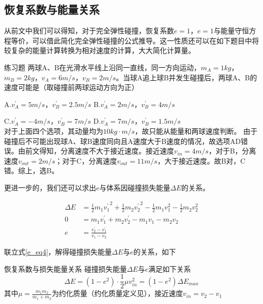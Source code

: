 \subsection{恢复系数与能量关系}

从前文中我们可以得知，对于完全弹性碰撞，恢复系数$e=1$，$e=1$与能量守恒方程等价，可以借此简化完全弹性碰撞的公式推导。这一性质还可以在如下题目中将较复杂的能量计算转换为相对速度的计算，大大简化计算量。

\begin{ep}{练习题}{}
两球A、B在光滑水平线上沿同一直线，同一方向运动，$m_A = 1kg$，$m_B = 2kg$，$v_A = 6m/s$，$v_B = 2m/s$。当球A追上球B并发生碰撞后，两球A、B的速度可能是（取碰撞前两球运动方向为正）

A.$v_A^{\prime} = 5m/s$，$v_B^{\prime} = 2.5m/s$ \quad B.$v_A^{\prime} = 2m/s$，$v_B^{\prime} = 4m/s$

C.$v_A^{\prime} = -4m/s$，$v_B^{\prime} = 7m/s$ \quad D.$v_A^{\prime} = 7m/s$，$v_B^{\prime} = 1.5m/s$
~\\

对于上面四个选项，其动量均为$10kg \cdot m/s$，故只能从能量和两球速度判断。
由于碰撞后不可能出现球A、球B速度同向且A速度大于B速度的情况，故选项AD错误。由前文得知，分离速度不大于接近速度。接近速度$v_{in}=4m/s$，对于B，分离速度$v_{out} = 2m/s$；对于C，分离速度$v_{out} = 11m/s$，大于接近速度。故B对，C错。综上，选B。
\end{ep}

更进一步的，我们还可以求出$e$与体系因碰撞损失能量$\Delta E$的关系。

\begin{equation}
\begin{aligned}
\Delta E &= \frac{1}{2} m_1 {v_1^{\prime}}^2 + \frac{1}{2} m_2 {v_2^{\prime}}^2 - \frac{1}{2} m_1 v_1^2 - \frac{1}{2} m_2 v_2^2 \\
0 &= m_1 v_1^{\prime} + m_2 v_2^{\prime} - m_1 v_1 - m_2 v_2 \\
e &= \frac{v_2^{\prime} - v_1^{\prime}}{v_1 - v_2}
\end{aligned}
\label{e_eq4}
\end{equation}

联立式\eqref{e_eq4}，解得碰撞损失能量$\Delta E$与$e$的关系，如下

\begin{theo}{恢复系数与损失能量关系}{}
碰撞损失能量$\Delta E$与$e$满足如下关系
$$\Delta E = (1 - e^2) \cdot \frac{1}{2} \mu v_{in}^2 = (1 - e^2) \Delta E_{max}$$
其中$\mu=\frac{m_1 m_2}{m_1 + m_2}$为约化质量（约化质量定义见），接近速度$v_{in} = v_2 - v_1$
\end{theo}


